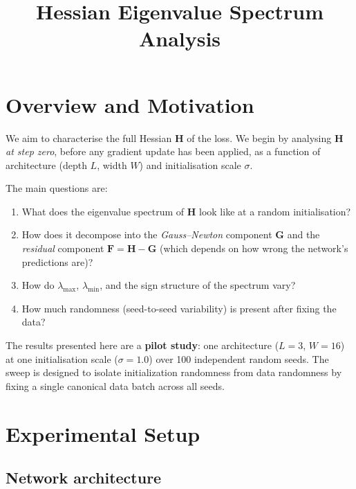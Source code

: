 \documentclass[12pt,a4paper]{article}
\title{%
  \textbf{Hessian Eigenvalue Spectrum Analysis}\\[0.5em]
}
\newcommand{\bH}{\mathbf{H}}
\newcommand{\bG}{\mathbf{G}}
\newcommand{\bF}{\mathbf{F}}
\begin{document}
\maketitle
\tableofcontents
\newpage

\section{Overview and Motivation}
\label{sec:overview}

We aim to characterise the full Hessian $\bH$ of the loss. We begin by analysing $\bH$ \emph{at step zero}, before any gradient update has been applied, as a function of architecture (depth $L$, width $W$) and initialisation scale $\sigma$.

The main questions are:
\begin{enumerate}
  \item What does the eigenvalue spectrum of $\bH$ look like at a random
        initialisation?
  \item How does it decompose into the \emph{Gauss--Newton} component $\bG$ and the
        \emph{residual} component $\bF = \bH - \bG$
        (which depends on how wrong the network's predictions are)?
  \item How do $\lambda_{\max}$, $\lambda_{\min}$, and the sign structure of
        the spectrum vary?
  \item How much randomness (seed-to-seed variability) is present after fixing
        the data?
\end{enumerate}

The results presented here are a \textbf{pilot study}: one architecture
($L=3$, $W=16$) at one initialisation scale ($\sigma=1.0$) over 100
independent random seeds. The sweep is designed to isolate initialization randomness
from data randomness by fixing a single canonical data batch across all seeds.


\section{Experimental Setup}
\label{sec:setup}

\subsection{Network architecture}
\label{ssec:arch}
\end{document}
